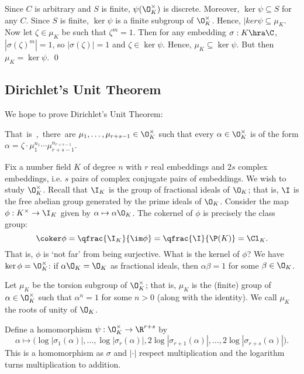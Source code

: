 Since $C$ is arbitrary and $S$ is finite, $\psi(\O_K^\times)$ is discrete. Moreover, $\ker \psi \subseteq S$ for any $C$. Since $S$ is finite, $\ker \psi$ is a finite subgroup of $\O_K^\times$. Hence, $|ker \psi \subseteq \mu_K$. Now let $\zeta \in \mu_K$ be such that $\zeta^m=1$. Then for any embedding $\sigma: K \hra \C$, $|\sigma(\zeta)^m|=1$, so $|\sigma(\zeta)|=1$ and $\zeta \in \ker \psi$. Hence, $\mu_K \subseteq \ker \psi$. But then $\mu_K= \ker \psi$. \qed \\




\subsection{Dirichlet's Unit Theorem \label{sec:unit}}


We hope to prove Dirichlet's Unit Theorem:

\unit

That is, there are $\mu_1,\ldots,\mu_{r+s-1} \in \O_K^\times$ such that every $\alpha \in \O_K^\times$ is of the form $\alpha= \zeta \cdot \mu_1^{n_1} \cdots \mu_{r+s-1}^{n_{r+s-1}}$.

Fix a number field $K$ of degree $n$ with $r$ real embeddings and $2s$ complex embeddings, i.e. $s$ pairs of complex conjugate pairs of embeddings. We wish to study $\O_K^\times$. Recall that $\I_K$ is the group of fractional ideals of $\O_K$; that is, $\I$ is the free abelian group generated by the prime ideals of $\O_K$. Consider the map $\phi: K^\times \to \I_K$ given by $\alpha \mapsto \alpha \O_K$. The cokernel of $\phi$ is precisely the class group:
	\[
	\coker \phi = \qfrac{\I_K}{\im \phi} = \qfrac{\I}{\P(K)}= \Cl_K. 
	\]
That is, $\phi$ is `not far' from being surjective. What is the kernel of $\phi$? We have $\ker \phi= \O_K^\times$: if $\alpha \O_K=\O_K$ as fractional ideals, then $\alpha\beta=1$ for some $\beta \in \O_K$. 

\begin{dfn}
Let $\mu_K$ be the torsion subgroup of $\O_K^\times$; that is, $\mu_K$ is the (finite) group of $\alpha \in \O_K^\times$ such that $\alpha^n=1$ for some $n>0$ (along with the identity). We call $\mu_K$ the roots of unity of $\O_K$. 
\end{dfn}

Define a homomorphism $\psi: \O_K^\times \to \R^{r+s}$ by
	\[
	\alpha \mapsto \big( \log|\sigma_1(\alpha)|, \ldots, \log|\sigma_r(\alpha)|, 2\log|\sigma_{r+1}(\alpha)|, \ldots, 2\log|\sigma_{r+s}(\alpha)| \big).
	\]
This is a homomorphism as $\sigma$ and $|\cdot|$ respect multiplication and the logarithm turns multiplication to addition. 

